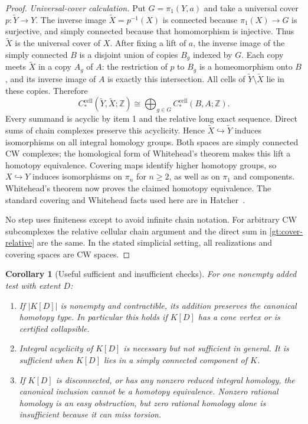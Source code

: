 \documentclass[11pt]{article}
\newtheorem{corollary}[theorem]{Corollary}
\theoremstyle{definition}
\begin{document}
\begin{proof}
\emph{Universal-cover calculation.} Put $G=\pi_1(Y,a)$ and take a
universal cover $p:\widetilde Y\to Y$. The inverse image
$\widetilde X=p^{-1}(X)$ is connected because $\pi_1(X)\to G$ is
surjective, and simply connected because that homomorphism is injective.
Thus $\widetilde X$ is the universal cover of $X$.
After fixing a lift of $a$, the inverse image of the simply connected
$B$ is a disjoint union of copies $B_g$ indexed by $G$. Each copy
meets $\widetilde X$ in a copy
$A_g$ of $A$: the restriction of $p$ to $B_g$ is a homeomorphism onto
$B$, and its inverse image of $A$ is exactly this intersection. All
cells of $\widetilde Y\setminus\widetilde X$ lie in these copies.
Therefore
\begin{equation}\label{gt:cover-relative}
 C_*^{\mathrm{cell}}(\widetilde Y,\widetilde X;\mathbb Z)
       \cong\bigoplus_{g\in G}C_*^{\mathrm{cell}}(B,A;\mathbb Z).
\end{equation}
Every summand is acyclic by item 1 and the relative long exact sequence.
Direct sums of chain complexes preserve this acyclicity. Hence
$\widetilde X\hookrightarrow\widetilde Y$ induces isomorphisms on
all integral homology groups. Both spaces are simply connected CW
complexes; the homological form of Whitehead's theorem makes this lift
a homotopy equivalence. Covering maps identify higher homotopy groups,
so $X\hookrightarrow Y$ induces isomorphisms on $\pi_n$ for $n\geq2$,
as well as on $\pi_1$ and components. Whitehead's theorem now proves
the claimed homotopy equivalence. The standard covering and Whitehead
facts used here are in Hatcher~\cite[Sections 1.3 and 4.1,
Corollary 4.33]{Hatcher}.

No step uses finiteness except to avoid infinite chain notation. For
arbitrary CW subcomplexes the relative cellular chain argument and the
direct sum in \eqref{gt:cover-relative} are the same. In the stated
simplicial setting, all realizations and covering spaces are CW spaces.
\end{proof}

\begin{corollary}[Useful sufficient and insufficient checks]
\label{gt:checks}
For one nonempty added test with extent $D$:
\begin{enumerate}
\item If $|K[D]|$ is nonempty and contractible, its addition preserves
the canonical homotopy type. In particular this holds if $K[D]$ has a
cone vertex or is certified collapsible.
\item Integral acyclicity of $K[D]$ is necessary but not sufficient
in general. It is sufficient when $K[D]$ lies in a simply connected
component of $K$.
\item If $K[D]$ is disconnected, or has any nonzero reduced integral
homology, the canonical inclusion cannot be a homotopy equivalence.
Nonzero rational homology is an easy obstruction, but zero rational
homology alone is insufficient because it can miss torsion.
\end{enumerate}
\end{corollary}
\end{document}
